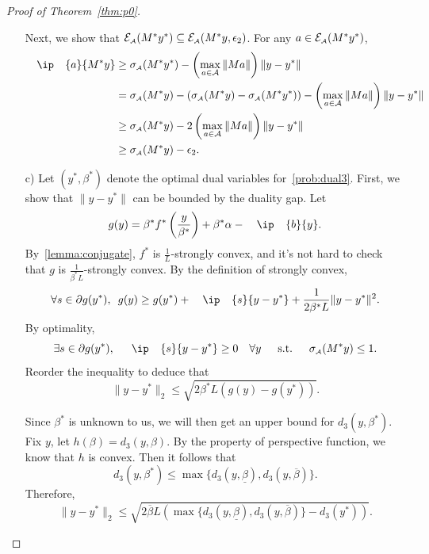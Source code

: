 \begin{proof}[Proof of Theorem~\ref{thm:p0}]
\begin{itemize}
      Next, we show that $\mathcal{E}_{\scriptscriptstyle\mathcal{A}}(M^*y^*) \subseteq \mathcal{E}_{\scriptscriptstyle\mathcal{A}}(M^*y, \epsilon_2)$. For any $a \in \mathcal{E}_{\scriptscriptstyle\mathcal{A}}(M^*y^*)$, 
      \begin{align*}
        \ip{a}{M^*y} &\geq \sigma\As(M^*y^*) - \left(\max\limits_{a \in \Ascr}\|Ma\|\right)\|y - y^*\|
        \\&= \sigma\As(M^*y) - \left(\sigma\As(M^*y) - \sigma\As(M^*y^*)\right) - \left(\max\limits_{a \in \Ascr}\|Ma\|\right)\|y - y^*\|
        \\&\geq \sigma\As(M^*y) - 2\left(\max\limits_{a \in \Ascr}\|Ma\|\right)\|y - y^*\|
        \\&\geq \sigma\As(M^*y) - \epsilon_2.
      \end{align*}
    
      \item[c)] Let $(y^*, \beta^*)$ denote the optimal dual variables for~\eqref{prob:dual3}. First, we show that $\|y - y^*\|$ can be bounded by the duality gap. Let 
      \[g(y) = \beta^*f^* \left(\frac{y}{\beta^*} \right) + \beta^*\alpha - \ip{b}{y}.\] 
      By~\autoref{lemma:conjugate}, $f^*$ is $\frac{1}{L}$-strongly convex, and it's not hard to check that $g$ is $\frac{1}{\beta^*L}$-strongly convex. By the definition of strongly convex,
      \[\forall s \in \partial g(y^*), \enspace g(y) \geq g(y^*) + \ip{s}{y- y^*} + \frac{1}{2\beta^*L}\|y - y^*\|^2.\]
      By optimality,
      \[\exists s \in \partial g(y^*), \enspace\ip{s}{y- y^*} \geq 0 \quad \forall y \enspace\text{s.t.}\enspace \sigma\As(M^*y)\leq1.\]
      Reorder the inequality to deduce that 
      \[\|y - y^*\|_2 \leq \sqrt{2\beta^*L(g(y) - g(y^*))}.\]
    
      Since $\beta^*$ is unknown to us, we will then get an upper bound for $d_3(y, \beta^*)$. Fix $y$, let $h(\beta) = d_3(y, \beta)$. By the property of perspective function, we know that $h$ is convex. Then it follows that 
      \[d_3(y, \beta^*) \leq \max\{d_3(y, \underline{\beta}), d_3(y, \overline{\beta})\}.\]
      Therefore,
      \[ \|y - y^*\|_2 \leq \sqrt{2\overline{\beta}L \left( \max\{d_3(y, \underline{\beta}), d_3(y, \overline{\beta})\} - d_3(y^*)\right) } .\]
    

\end{itemize}
\end{proof}
